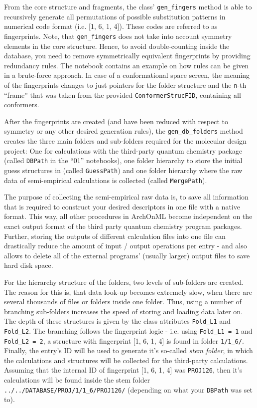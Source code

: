 \documentclass[12pt]{achemso}
\begin{document}
\noindent From the core structure and fragments, the class' \texttt{gen\_fingers} method is able to recursively generate all permutations of possible substitution patterns in numerical code format (i.e. [1, 6, 1, 4]). These codes are referred to as fingerprints. Note, that \texttt{gen\_fingers} does not take into account symmetry elements in the core structure. Hence, to avoid double-counting inside the database, you need to remove symmetrically equivalent fingerprints by providing redundancy rules. The notebook contains an example on how rules can be given in a brute-force approach. In case of a conformational space screen, the meaning of the fingerprints changes to just pointers for the folder structure and the \texttt{n}-th ``frame'' that was taken from the provided \texttt{ConformerStrucFID}, containing all conformers.

\noindent After the fingerprints are created (and have been reduced with respect to symmetry or any other desired generation rules), the \texttt{gen\_db\_folders} method creates the three main folders and sub-folders required for the molecular design project: One for calculations with the third-party quantum chemistry package (called \texttt{DBPath} in the ``01'' notebooks), one folder hierarchy to store the initial guess structures in (called \texttt{GuessPath}) and one folder hierarchy where the raw data of semi-empirical calculations is collected (called \texttt{MergePath}).

\noindent The purpose of collecting the semi-empirical raw data is, to save all information that is required to construct your desired descriptors in one file with a native format. This way, all other procedures in ArchOnML become independent on the exact output format of the third party quantum chemistry program packages. Further, storing the outputs of different calculation files into one file can drastically reduce the amount of input / output operations per entry - and also allows to delete all of the external programs' (usually larger) output files to save hard disk space.

\noindent For the hierarchy structure of the folders, two levels of sub-folders are created. The reason for this is, that data look-up becomes extremely slow, when there are several thousands of files or folders inside one folder. Thus, using a number of branching sub-folders increases the speed of storing and loading data later on. The depth of these structures is given by the class attributes \texttt{Fold\_L1} and \texttt{Fold\_L2}. The branching follows the fingerprint logic - i.e. using \texttt{Fold\_L1 = 1} and \texttt{Fold\_L2 = 2}, a structure with fingerprint [1, 6, 1, 4] is found in folder \texttt{1/1\_6/}. Finally, the entry's ID will be used to generate it's so-called \textit{stem folder}, in which the calculations and structures will be collected for the third-party calculations. Assuming that the internal ID of fingerprint [1, 6, 1, 4] was \texttt{PROJ126}, then it's calculations will be found inside the stem folder \texttt{../../DATABASE/PROJ/1/1\_6/PROJ126/} (depending on what your \texttt{DBPath} was set to).
\end{document}
